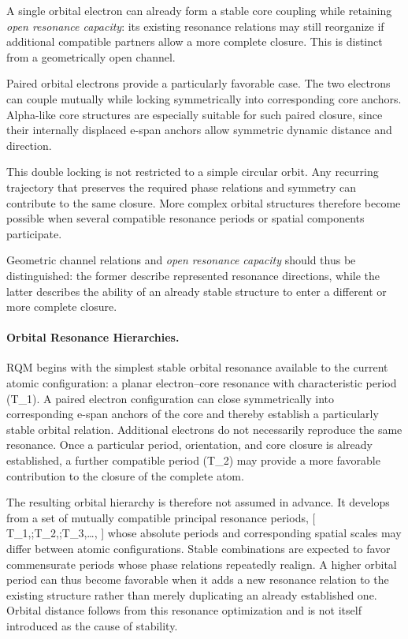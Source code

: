 \documentclass[11pt,a4paper]{article}
\begin{document}
A single orbital electron can already form a stable core coupling while retaining \emph{open resonance capacity}: its existing resonance relations may still reorganize if additional compatible partners allow a more complete closure. This is distinct from a geometrically open channel.

Paired orbital electrons provide a particularly favorable case. The two electrons can couple mutually while locking symmetrically into corresponding core anchors. Alpha-like core structures are especially suitable for such paired closure, since their internally displaced e-span anchors allow symmetric dynamic distance and direction.

This double locking is not restricted to a simple circular orbit. Any recurring trajectory that preserves the required phase relations and symmetry can contribute to the same closure. More complex orbital structures therefore become possible when several compatible resonance periods or spatial components participate.

Geometric channel relations and \emph{open resonance capacity} should thus be distinguished: the former describe represented resonance directions, while the latter describes the ability of an already stable structure to enter a different or more complete closure.





\paragraph{Orbital Resonance Hierarchies.}
RQM begins with the simplest stable orbital resonance available to the current atomic configuration: a planar electron–core resonance with characteristic period (T_1). A paired electron configuration can close symmetrically into corresponding e-span anchors of the core and thereby establish a particularly stable orbital relation. Additional electrons do not necessarily reproduce the same resonance. Once a particular period, orientation, and core closure is already established, a further compatible period (T_2) may provide a more favorable contribution to the closure of the complete atom.

The resulting orbital hierarchy is therefore not assumed in advance. It develops from a set of mutually compatible principal resonance periods,
[
T_1,;T_2,;T_3,\ldots,
]
whose absolute periods and corresponding spatial scales may differ between atomic configurations. Stable combinations are expected to favor commensurate periods whose phase relations repeatedly realign. A higher orbital period can thus become favorable when it adds a new resonance relation to the existing structure rather than merely duplicating an already established one. Orbital distance follows from this resonance optimization and is not itself introduced as the cause of stability.
\end{document}
